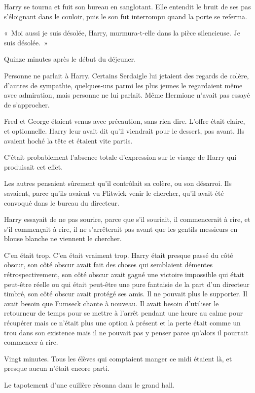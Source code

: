 Harry se tourna et fuit son bureau en sanglotant.
Elle entendit le bruit de ses pas s'éloignant dans le couloir, puis le son fut interrompu quand la porte se referma.

«~Moi aussi je suis désolée, Harry, murmura-t-elle dans la pièce silencieuse.
Je suis désolée.~»

\later

Quinze minutes après le début du déjeuner.

Personne ne parlait à Harry.
Certains Serdaigle lui jetaient des regards de colère, d'autres de sympathie, quelques-uns parmi les plus jeunes le regardaient même avec admiration, mais personne ne lui parlait.
Même Hermione n'avait pas essayé de s'approcher.

Fred et George étaient venus avec précaution, sans rien dire.
L'offre était claire, et optionnelle.
Harry leur avait dit qu'il viendrait pour le dessert, pas avant.
Ils avaient hoché la tête et étaient vite partis.

C'était probablement l'absence totale d'expression sur le visage de Harry qui produisait cet effet.

Les autres pensaient sûrement qu'il contrôlait sa colère, ou son désarroi.
Ils savaient, parce qu'ils avaient vu Flitwick venir le chercher, qu'il avait été convoqué dans le bureau du directeur.

Harry essayait de ne pas sourire, parce que s'il souriait, il commencerait à rire, et s'il commençait à rire, il ne s'arrêterait pas avant que les gentils messieurs en blouse blanche ne viennent le chercher.

C'en était trop.
C'en était vraiment trop.
Harry était presque passé du côté obscur, son côté obscur avait fait des choses qui semblaient démentes rétrospectivement, son côté obscur avait gagné une victoire impossible qui était peut-être réelle ou qui était peut-être une pure fantaisie de la part d'un directeur timbré, son côté obscur avait protégé ses amis.
Il ne pouvait plus le supporter.
Il avait besoin que Fumseck chante à nouveau.
Il avait besoin d'utiliser le retourneur de temps pour se mettre à l'arrêt pendant une heure au calme pour récupérer mais ce n'était plus une option à présent et la perte était comme un trou dans son existence mais il ne pouvait pas y penser parce qu'alors il pourrait commencer à rire.

Vingt minutes.
Tous les élèves qui comptaient manger ce midi étaient là, et presque aucun n'était encore parti.

Le tapotement d'une cuillère résonna dans le grand hall.

